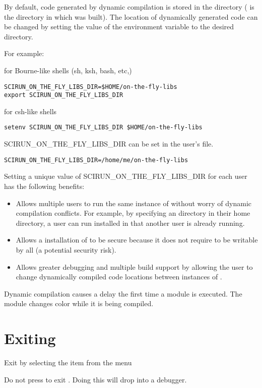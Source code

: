 By default, code generated by dynamic compilation is stored in the
directory  
( is the directory in which \sr{} was built).  The
location of dynamically generated code can be changed by setting the
value of the environment variable
 to the desired directory. 

For example:

for Bourne-like shells (sh, ksh, bash, etc,)

\begin{verbatim}
SCIRUN_ON_THE_FLY_LIBS_DIR=$HOME/on-the-fly-libs
export SCIRUN_ON_THE_FLY_LIBS_DIR
\end{verbatim}

for csh-like shells

\begin{verbatim}
setenv SCIRUN_ON_THE_FLY_LIBS_DIR $HOME/on-the-fly-libs
\end{verbatim}

SCIRUN\_ON\_THE\_FLY\_LIBS\_DIR can be set in the user's
 file.

\begin{verbatim}
SCIRUN_ON_THE_FLY_LIBS_DIR=/home/me/on-the-fly-libs
\end{verbatim}

Setting a unique value of SCIRUN\_ON\_THE\_FLY\_LIBS\_DIR for each
\sr{} user has the following benefits:

\begin{itemize}
\item Allows multiple users to run the same instance of \sr{} without worry of  dynamic compilation conflicts.
  For example, by specifying an 
  directory in their home directory, a user can run 
  \sr{} installed in  that another user
  is already running.

\item Allows a  installation of \sr{}
  to be secure because it does not require
   to be writable by
  all (a potential security risk).

\item Allows greater debugging and multiple build support by
  allowing the user to change dynamically compiled code locations
  between instances of \sr{}.

\end{itemize}

Dynamic compilation causes a delay the first time a module is
executed.  The module changes color while it is being
compiled.

\section{Exiting \sr{}}
\label{sec:stopping}

Exit \sr{} by selecting the  item from the  menu

Do not press  to exit \sr{}.  Doing this will drop
\sr{} into a debugger.


